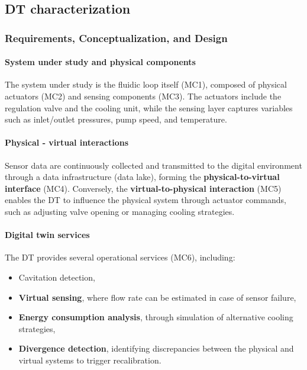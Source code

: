\documentclass[
]{article}
\providecommand{\tightlist}{%
  \setlength{\itemsep}{0pt}\setlength{\parskip}{0pt}}
\begin{document}
\subsection{DT characterization}\label{dt-characterization}

\subsubsection{Requirements, Conceptualization, and
Design}\label{requirements-conceptualization-and-design}

\paragraph{System under study and physical
components}\label{system-under-study-and-physical-components}

The system under study is the fluidic loop itself (MC1), composed of
physical actuators (MC2) and sensing components (MC3). The actuators
include the regulation valve and the cooling unit, while the sensing
layer captures variables such as inlet/outlet pressures, pump speed, and
temperature.

\paragraph{Physical - virtual
interactions}\label{physical---virtual-interactions}

Sensor data are continuously collected and transmitted to the digital
environment through a data infrastructure (data lake), forming the
\textbf{physical-to-virtual interface} (MC4). Conversely, the
\textbf{virtual-to-physical interaction} (MC5) enables the DT to
influence the physical system through actuator commands, such as
adjusting valve opening or managing cooling strategies.

\paragraph{Digital twin services}\label{digital-twin-services}

The DT provides several operational services (MC6), including:

\begin{itemize}
\tightlist
\item
  Cavitation detection,
\item
  \textbf{Virtual sensing}, where flow rate can be estimated in case of
  sensor failure,
\item
  \textbf{Energy consumption analysis}, through simulation of
  alternative cooling strategies,
\item
  \textbf{Divergence detection}, identifying discrepancies between the
  physical and virtual systems to trigger recalibration.
\end{itemize}
\end{document}
